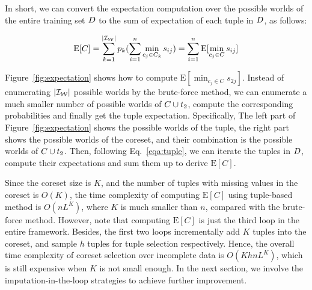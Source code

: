 In short, we can convert the expectation computation over the possible worlds of the entire training set $D$ to the sum of expectation of each tuple in $D$, as follows:


\begin{equation}\label{eqa:tuple}
	\mathrm{E}[C] = \sum_{k= 1}^{|\mathcal{I_W}|} p_k (\sum_{i=1}^n \min_{c_j\in C_k}s_{ij})= \sum_{i=1}^n \mathrm{E}[\min_{c_j\in C}s_{ij}]
\end{equation}

\begin{example}
	Figure~\ref{fig:expectation} shows how to compute $\mathrm{E}[\min_{c_j\in C}s_{2j}]$. Instead of enumerating $|\mathcal{I_W}|$ possible worlds by the brute-force method, we can enumerate a much smaller number of possible worlds of $C \cup t_2$, compute the corresponding probabilities and finally get the tuple expectation. Specifically, The left part of Figure~\ref{fig:expectation} shows the possible worlds of the tuple,  the right part shows the possible worlds of the coreset, and their combination is the possible worlds of $C \cup t_2$. Then, following Eq.~\ref{eqa:tuple}, we can iterate the tuples in $D$, compute their expectations and sum them up to derive $\mathrm{E}[C]$.
\end{example}

 Since the coreset size is $K$, and  the number of tuples with missing values in the coreset is $O(K)$, the time complexity of computing $\mathrm{E}[C]$ using tuple-based method is $O(nL^K)$, where $K$ is much smaller than $n$, compared with the brute-force method. However, note that computing $\mathrm{E}[C]$ is just the third loop in the entire framework. Besides, the first two loops incrementally add $K$ tuples into the coreset, and sample $h$ tuples for tuple selection respectively. Hence, the overall time complexity of coreset selection over incomplete data is $O(KhnL^K)$, which is still expensive when $K$ is not small enough.  
In the next section, we involve the imputation-in-the-loop strategies to achieve further improvement.







